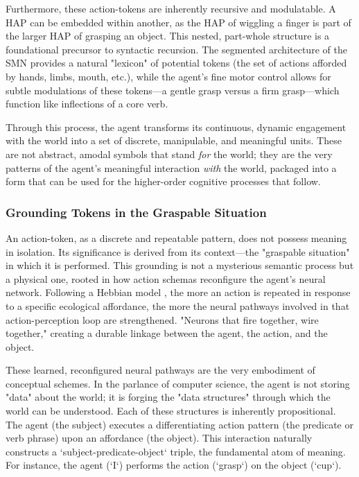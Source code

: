 Furthermore, these action-tokens are inherently recursive and modulatable. A HAP can be embedded within another, as the HAP of wiggling a finger is part of the larger HAP of grasping an object. This nested, part-whole structure is a foundational precursor to syntactic recursion. The segmented architecture of the SMN provides a natural "lexicon" of potential tokens (the set of actions afforded by hands, limbs, mouth, etc.), while the agent's fine motor control allows for subtle modulations of these tokens—a gentle grasp versus a firm grasp—which function like inflections of a core verb.

Through this process, the agent transforms its continuous, dynamic engagement with the world into a set of discrete, manipulable, and meaningful units. These are not abstract, amodal symbols that stand \textit{for} the world; they are the very patterns of the agent's meaningful interaction \textit{with} the world, packaged into a form that can be used for the higher-order cognitive processes that follow.

\subsubsection{Grounding Tokens in the Graspable Situation}
\label{ssubsec:grounding}
An action-token, as a discrete and repeatable pattern, does not possess meaning in isolation. Its significance is derived from its context—the "graspable situation" in which it is performed. This grounding is not a mysterious semantic process but a physical one, rooted in how action schemas reconfigure the agent's neural network. Following a Hebbian model \cite{hebb1949organization}, the more an action is repeated in response to a specific ecological affordance, the more the neural pathways involved in that action-perception loop are strengthened. "Neurons that fire together, wire together," creating a durable linkage between the agent, the action, and the object.

These learned, reconfigured neural pathways are the very embodiment of conceptual schemes. In the parlance of computer science, the agent is not storing "data" about the world; it is forging the "data structures" through which the world can be understood. Each of these structures is inherently propositional. The agent (the subject) executes a differentiating action pattern (the predicate or verb phrase) upon an affordance (the object). This interaction naturally constructs a `subject-predicate-object` triple, the fundamental atom of meaning. For instance, the agent (`I`) performs the action (`grasp`) on the object (`cup`).

